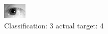 \begin{figure}[h!]
\begin{center}
\includegraphics[width=0.60\columnwidth]{figures/ID1235_class_3_target_4.png}
\end{center}
\caption{ Classification: 3 actual target: 4}
\label{fig:ID1235_class_3_target_4}
\end{figure}
